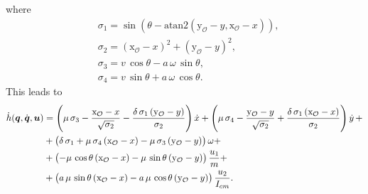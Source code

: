 where
\begin{align*}
    &\sigma_1 =\sin \left(\theta -\textrm{atan2}\left(\mathrm{y_\mathcal{O}}-y,\mathrm{x_\mathcal{O}}-x\right)\right),\\
    &\sigma_2 ={{\left(\mathrm{x_\mathcal{O}}-x\right)}}^2 +{{\left(\mathrm{y_\mathcal{O}}-y\right)}}^2,\\
    &\sigma_3 =v\,\cos \theta -a\,\omega\,\sin \theta,\\
    &\sigma_4 =v\,\sin \theta +a\,\omega\,\cos \theta.
\end{align*}
This leads to
\begin{equation*}
\begin{split}
    \dot{h}({\boldsymbol{q}},\dot{\boldsymbol{q}},\boldsymbol{u}) &= \left(\mu \,\sigma_3 -\frac{\mathrm{x_\mathcal{O}}-x}{\sqrt{\sigma_2 }}-\frac{\delta \,\sigma_1 \,{\left(\mathrm{y_\mathcal{O}}-y\right)}}{\sigma_2 }\right) \dot{x} + \left(\mu \,\sigma_4 -\frac{\mathrm{y_\mathcal{O}}-y}{\sqrt{\sigma_2 }}+\frac{\delta \,\sigma_1 \,{\left(\mathrm{x_\mathcal{O}}-x\right)}}{\sigma_2 }\right) \dot{y} \,+ \\ & + \left(\delta \,\sigma_1 +\mu \,\sigma_4 \,{\left(\mathrm{x_\mathcal{O}}-x\right)}-\mu \,\sigma_3 \,{\left(\mathrm{y_\mathcal{O}}-y\right)}\right) \omega + \\ &+\left(-\mu \,\cos \theta\,{\left(\mathrm{x_\mathcal{O}}-x\right)}-\mu \,\sin \theta\,{\left(\mathrm{y_\mathcal{O}}-y\right)}\right) \frac{u_1}{m} + \\& + \left(a\,\mu \,\sin \theta\,{\left(\mathrm{x_\mathcal{O}}-x\right)}-a\,\mu \,\cos \theta\,{\left(\mathrm{y_\mathcal{O}}-y\right)} \right) \frac{u_2}{I_{cm}} .
\end{split} 
\end{equation*}